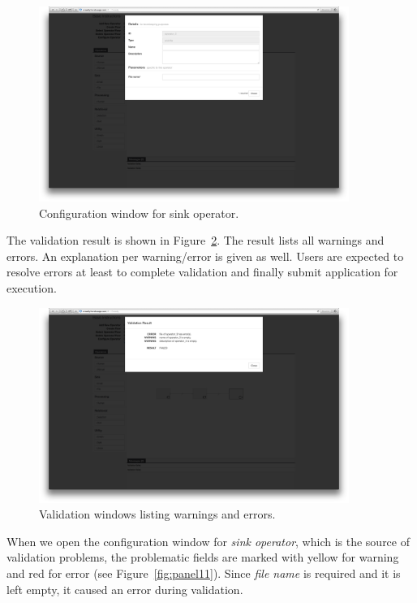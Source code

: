 \begin{figure}[ht]
	\centering
	\includegraphics[width=0.9\textwidth]{figures/tool/panel9.png}
	\caption{Configuration window for sink operator.}
	\label{fig:panel9}
\end{figure}

The validation result is shown in Figure~\ref{fig:panel10}. The result lists all warnings 
and errors. An explanation per warning/error is given as well. Users are expected 
to resolve errors at least to complete validation and finally submit application for 
execution.

\begin{figure}[ht]
	\centering
	\includegraphics[width=0.9\textwidth]{figures/tool/panel10.png}
	\caption{Validation windows listing warnings and errors.}
	\label{fig:panel10}
\end{figure}

When we open the configuration window for \textit{sink operator}, which is the source 
of validation problems, the problematic fields are marked with yellow for warning and 
red for error (see Figure~\ref{fig:panel11}). Since \textit{file name} is required and it is 
left empty, it caused an error during validation.

